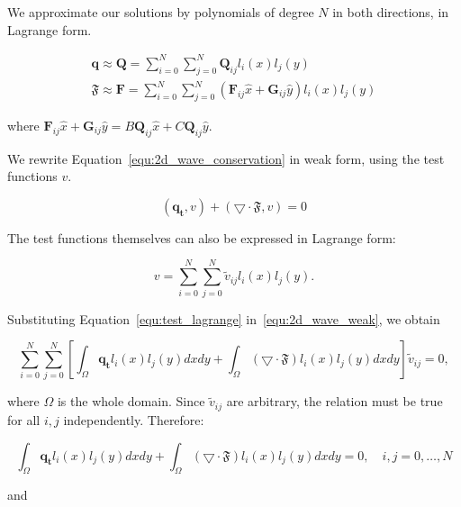 We approximate our solutions by polynomials of degree \(N\) in both directions, in Lagrange
form. 

\begin{gather}
    \mathbf{q} \approx \mathbf{Q} = \sum_{i = 0}^{N}\sum_{j = 0}^{N}\mathbf{Q}_{i j}l_i(x)l_j(y) \\
    \mathfrak{F} \approx \mathbf{F} = \sum_{i = 0}^{N} \sum_{j = 0}^{N} \left ( \mathbf{F}_{i j} \widehat{x} + \mathbf{G}_{i j}\widehat{y}\right ) l_i(x) l_j(y)
\end{gather}

where \(\mathbf{F}_{i j} \widehat{x} + \mathbf{G}_{i j}\widehat{y} = B \mathbf{Q}_{i j}\widehat{x}
+ C \mathbf{Q}_{i j}\widehat{y}\). 

We rewrite Equation~\ref{equ:2d_wave_conservation} in weak form, using the test functions \(v\).

\begin{equation} \label{equ:2d_wave_weak}
    \left( \mathbf{q_t}, v \right) + \left( \bigtriangledown \cdot \mathfrak{F}, v \right) = 0
\end{equation}

The test functions themselves can also be expressed in Lagrange form:

\begin{equation} \label{equ:test_lagrange}
    v = \sum^{N}_{i = 0}\sum_{j = 0}^{N}\widetilde{v}_{i j}l_i(x)l_j(y).
\end{equation}

Substituting Equation~\ref{equ:test_lagrange} in~\ref{equ:2d_wave_weak}, we obtain

\begin{equation}
    \sum_{i = 0}^{N}\sum_{j = 0}^{N} \left[ \int_{\Omega }\mathbf{q_t} l_i(x) l_j(y) dx dy + \int_{\Omega } \left( \bigtriangledown \cdot \mathfrak{F} \right) l_i(x) l_j(y) dx dy \right] \widetilde{v}_{i j} = 0,
\end{equation}

\noindent
where \(\Omega \) is the whole domain. Since \(\widetilde{v}_{i j}\) are arbitrary, the relation
must be true for all \(i,j\) independently. Therefore:

\begin{equation}
    \int_{\Omega} \mathbf{q_t} l_i(x) l_j(y) dx dy + \int_{\Omega } \left( \bigtriangledown \cdot \mathfrak{F} \right) l_i(x) l_j(y) dx dy = 0, \quad i,j = 0, \ldots, N
\end{equation}

\noindent
and

